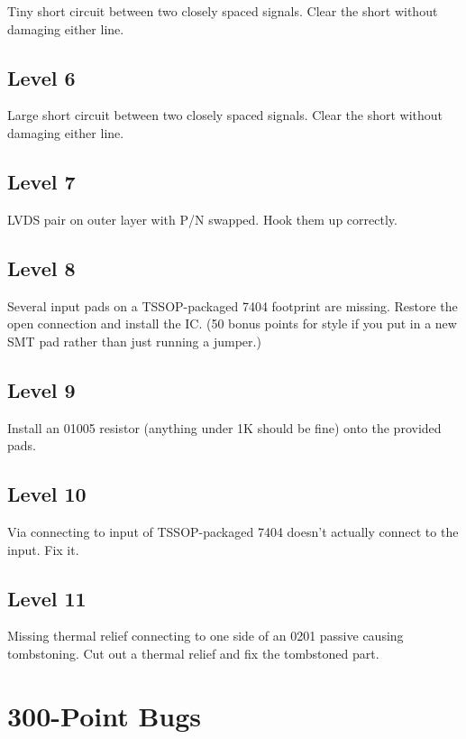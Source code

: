 \documentclass{article}
\begin{document}
Tiny short circuit between two closely spaced signals. Clear the short without damaging either line.

\subsection{Level 6}

Large short circuit between two closely spaced signals. Clear the short without damaging either line.

\subsection{Level 7}

LVDS pair on outer layer with P/N swapped. Hook them up correctly.

\subsection{Level 8}

Several input pads on a TSSOP-packaged 7404 footprint are missing. Restore the open connection and install the IC. (50
bonus points for style if you put in a new SMT pad rather than just running a jumper.)

\subsection{Level 9}

Install an 01005 resistor (anything under 1K should be fine) onto the provided pads.

\subsection{Level 10}

Via connecting to input of TSSOP-packaged 7404 doesn't actually connect to the input. Fix it.

\subsection{Level 11}

Missing thermal relief connecting to one side of an 0201 passive causing tombstoning. Cut out a thermal relief and fix
the tombstoned part.

\pagebreak
\section{300-Point Bugs}
\end{document}
